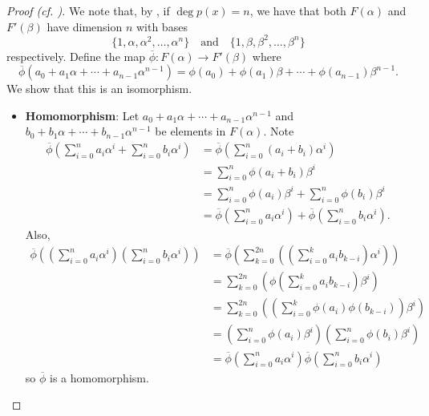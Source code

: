 \begin{proof}[Proof (cf. {\cite[Lemma 21.32]{judson_beezer_2022}})]
    We note that, by , if $\deg p(x) = n$, we have that both $F(\alpha)$ and $F'(\beta)$ have dimension $n$ with bases
    \[
        \{1, \alpha, \alpha^2, \dots, \alpha^n\} \quad\text{and}\quad\{1, \beta, \beta^2, \dots, \beta^n\}
    \]
    respectively. Define the map $\overline{\phi}: F(\alpha) \to F'(\beta)$ where
    \[
        \overline{\phi}\left(a_0 + a_1\alpha + \cdots + a_{n-1}\alpha^{n-1}\right) = \phi(a_0) + \phi(a_1)\beta + \cdots + \phi(a_{n-1})\beta^{n-1}.
    \]
    We show that this is an isomorphism.
    \begin{itemize}
        \item \textbf{Homomorphism}: Let $a_0 + a_1\alpha + \cdots + a_{n-1}\alpha^{n-1}$ and $b_0 + b_1\alpha + \cdots + b_{n-1}\alpha^{n-1}$ be elements in $F(\alpha)$. Note
        \begin{align*}
            \overline{\phi}\left(\sum_{i=0}^na_i\alpha^i + \sum_{i=0}^nb_i\alpha^i\right) &=\overline{\phi}\left(\sum_{i=0}^n(a_i+b_i)\alpha^i\right)\\
            &=\sum_{i=0}^n\phi(a_i+b_i)\beta^i\\
            &= \sum_{i=0}^n\phi(a_i)\beta^i + \sum_{i=0}^n\phi(b_i)\beta^i\\
            &= \overline{\phi}\left(\sum_{i=0}^na_i\alpha^i\right) + \overline{\phi}\left(\sum_{i=0}^nb_i\alpha^i\right).
        \end{align*}
        Also,
        \begin{align*}
            \overline{\phi}\left(\left(\sum_{i=0}^na_i\alpha^i\right)\left(\sum_{i=0}^nb_i\alpha^i\right)\right) &= \overline{\phi}\left(\sum_{k=0}^{2n}\left(\left(\sum_{i=0}^ka_ib_{k-i}\right)\alpha^i\right)\right)\\
            &= \sum_{k=0}^{2n}\left(\phi\left(\sum_{i=0}^ka_ib_{k-i}\right)\beta^i\right)\\
            &= \sum_{k=0}^{2n}\left(\left(\sum_{i=0}^k\phi(a_i)\phi(b_{k-i})\right)\beta^i\right)\\
            &=\left(\sum_{i=0}^n\phi(a_i)\beta^i\right)\left(\sum_{i=0}^n\phi(b_i)\beta^i\right)\\
            &= \overline{\phi}\left(\sum_{i=0}^na_i\alpha^i\right)\overline{\phi}\left(\sum_{i=0}^nb_i\alpha^i\right)
        \end{align*}
        so $\overline{\phi}$ is a homomorphism.


\end{itemize}
\end{proof}
